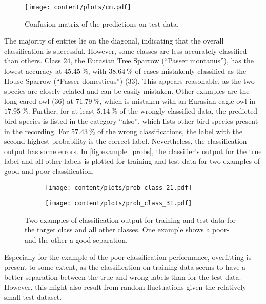 \begin{figure}
    \centering
    \texttt{[image: content/plots/cm.pdf]}
    \caption{Confusion matrix of the predictions on test data.}
    \label{fig:cm}
\end{figure}
The majority of entries lie on the diagonal, indicating that the overall classification is successful. However, some classes are less accurately classified than others. 
Class $\num{24}$, the Eurasian Tree Sparrow (\enquote{Passer montanus}), has the lowest accuracy at $\qty{45.45}{\percent}$, with $\qty{38.64}{\percent}$ of cases mistakenly classified 
as the House Sparrow (\enquote{Passer domesticus}) (33).
This appears reasonable, as the two species are closely related and can be easily mistaken. 
Other examples are the long-eared owl (36) at $\qty{71.79}{\percent}$, which is mistaken with an Eurasian eagle-owl in $\qty{17.95}{\percent}$.
Further, for at least $\qty{5.14}{\percent}$ of the wrongly classified data, 
the predicted bird species is listed in the category \enquote{also}, which lists other bird species present in the recording. For $\qty{57.43}{\percent}$ of the wrong classifications, 
the label with the second-highest probability is the correct label.
Nevertheless, the classification output has some errors. In \autoref{fig:example_probs}, the classifier's output for the true label and all other labels is plotted for training and test
data for two examples of good and poor classification.
\begin{figure}
    \centering
    \begin{subfigure}[c]{0.45\textwidth}
        \centering
        \texttt{[image: content/plots/prob\_class\_21.pdf]}
    \end{subfigure}
    \begin{subfigure}[c]{0.45\textwidth}
        \centering
        \texttt{[image: content/plots/prob\_class\_31.pdf]}
    \end{subfigure}
    \caption{Two examples of classification output for training and test data for the target class and all other classes. One example shows a poor- and the other a good separation.}
    \label{fig:example_probs}
\end{figure}
Especially for the example of the poor classification performance, overfitting is present to some extent, as the classification on training data seems to have a better
separation between the true and wrong labels than for the test data. However, this might also result from random fluctuations given the relatively small test dataset.
